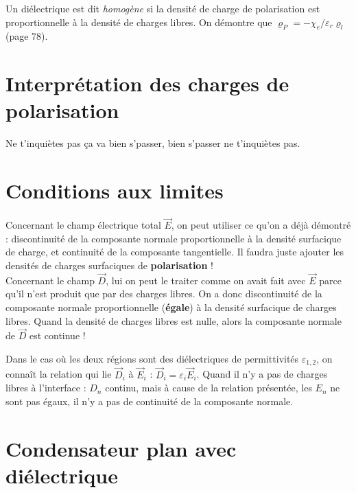 \documentclass[12pt]{book}
\begin{document}

Un diélectrique est dit \textit{homogène} si la densité de charge de polarisation est proportionnelle à la densité de charges libres. On démontre que $\varrho_P = -\chi_e / \varepsilon_r \varrho_l$ (page 78).

\section{Interprétation des charges de polarisation}
Ne t'inquiètes pas ça va bien s'passer, bien s'passer ne t'inquiètes pas.
\section{Conditions aux limites}
Concernant le champ électrique total $\vec{E}$, on peut utiliser ce qu'on a déjà démontré : discontinuité de la composante normale proportionnelle à la densité surfacique de charge, et continuité de la composante tangentielle. Il faudra juste ajouter les densités de charges surfaciques de \textbf{polarisation} ! \\

Concernant le champ $\vec{D}$, lui on peut le traiter comme on avait fait avec $\vec{E}$ parce qu'il n'est produit que par des charges libres. On a donc discontinuité de la composante normale proportionnelle (\textbf{égale}) à la densité surfacique de charges libres. Quand la densité de charges libres est nulle, alors la composante normale de $\vec{D}$ est continue !


Dans le cas où les deux régions sont des diélectriques de permittivités $\varepsilon_{1,2}$, on connaît la relation qui lie $\vec{D}_i$ à $\vec{E}_i$ : $\vec{D}_i = \varepsilon_i\vec{E}_i$. Quand il n'y a pas de charges libres à l'interface : $D_n$ continu, mais à cause de la relation présentée, les $E_n$ ne sont pas égaux, il n'y a pas de continuité de la composante normale.

\section{Condensateur plan avec diélectrique}
\end{document}
